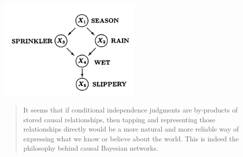 \includegraphics[width=200pt]{img/statistics-and-machine-learning--pearl--causality--conditional-independence-and-graphoids-cddf.png}

\begin{quote}
  It seems that if conditional independence judgments are by-products of stored causal relationships, then
  tapping and representing those relationships directly would be a more natural and more reliable way of
  expressing what we know or believe about the world. This is indeed the philosophy behind causal Bayesian
  networks.
\end{quote}
